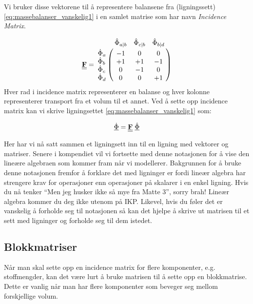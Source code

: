 Vi bruker disse vektorene til å representere balansene fra (ligningssett) \ref{eq:massebalanser_vanskelig1} i en samlet matrise som har navn \textit{Incidence Matrix}.

\begin{equation}
    \textbf{\doubleunderline{F}} = 
    \bordermatrix{~ & \hat{\Phi}_{a|b} & \hat{\Phi}_{c|b}  & \hat{\Phi}_{b|d} \cr
                  \dot{\Phi}_a & -1 & 0 & 0 \cr
                  \dot{\Phi}_b & +1 & +1 & -1\cr
                  \dot{\Phi}_c & 0 & -1 & 0\cr
                  \dot{\Phi}_d & 0 & 0 & +1
                  }
\end{equation}
Hver rad i incidence matrix representerer en balanse og hver kolonne representerer transport fra et volum til et annet. Ved å sette opp incidence matrix kan vi skrive ligningsettet \ref{eq:massebalanser_vanskelig1} som:

\begin{equation}
   \underline{\dot{\Phi}} = \textbf{\underline{\underline{F}}}\hspace{0.1cm}\underline{\hat{\Phi}}
\end{equation}

Her har vi nå satt sammen et ligningsett inn til en ligning med vektorer og matriser. Senere i kompendiet vil vi fortsette med denne notasjonen for å vise den lineære algebraen som kommer fram når vi modellerer. Bakgrunnen for å bruke denne notasjonen fremfor å forklare det med ligninger er fordi lineær algebra har strengere krav for operasjoner enn operasjoner på skalarer i en enkel ligning. Hvis du nå tenker ``Men jeg husker ikke så mye fra Matte 3'', sorry brah! Lineær algebra kommer du deg ikke utenom på IKP. Likevel, hvis du føler det er vanskelig å forholde seg til notasjonen så kan det hjelpe å skrive ut matrisen til et sett med ligninger og forholde seg til dem istedet. 

\clearpage
\subsection{Blokkmatriser}
Når man skal sette opp en incidence matrix for flere komponenter, e.g. stoffmengder, kan det være lurt å bruke matrisen til å sette opp en blokkmatrise. Dette er vanlig når man har flere komponenter som beveger seg mellom forskjellige volum. 

